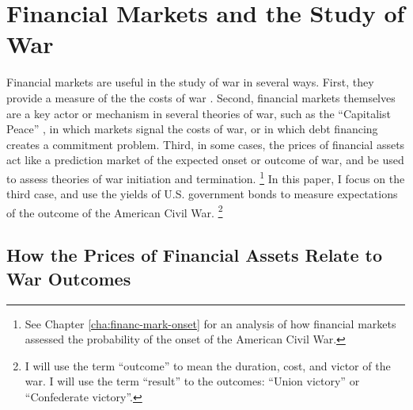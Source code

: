 



\section{Financial Markets and the Study of War}
\label{bonds_battles:sec:barg-theory-war}

Financial markets are useful in the study of war in several ways.
First, they provide a measure of the the costs of war \parencites{SchneiderTroeger2006}{GuidolinLaFerrara2010}.
Second, financial markets themselves are a key actor or mechanism in several theories of war, such as the ``Capitalist Peace'' \parencites{Gartzke2007}{DafoeKelsey2014a}, in which markets signal the costs of war, or \textcite{Slantchev2012a} in which debt financing creates a commitment problem.
Third, in some cases, the prices of financial assets act like a prediction market of the expected onset or outcome of war, and be used to assess theories of war initiation and termination.%
\footnote{See Chapter \ref{cha:financ-mark-onset} for an analysis of how financial markets assessed the probability of the onset of the American Civil War.}
In this paper, I focus on the third case, and use the yields of U.S. government bonds to measure expectations of the outcome of the American Civil War.%
\footnote{I will use the term ``outcome'' to mean the duration, cost, and victor of the war. I will use the term ``result'' to the outcomes: ``Union victory'' or ``Confederate victory''.}


\subsection{How the Prices of Financial Assets Relate to War Outcomes}
\label{bonds_battles:sec:how-prices-financial}

